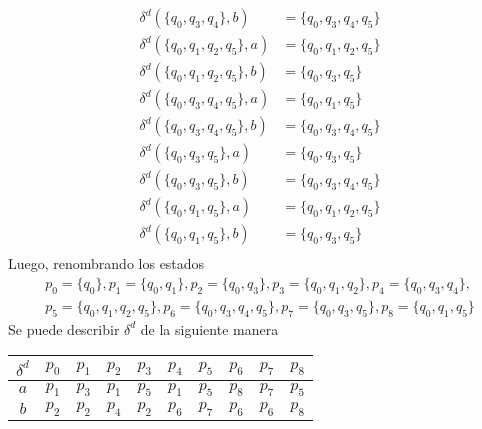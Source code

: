 \documentclass{article}
\begin{document}
\begin{enumerate}
{\begin{itemize}
\begin{enumerate}
{\begin{align*}
                            \delta^{d}(\{q_{0}, q_{3}, q_{4}\}, b) &= \{q_{0}, q_{3}, q_{4}, q_{5}\}\\
                            \delta^{d}(\{q_{0}, q_{1}, q_{2}, q_{5}\}, a) &= \{q_{0}, q_{1}, q_{2}, q_{5}\} \\
                            \delta^{d}(\{q_{0}, q_{1}, q_{2}, q_{5}\}, b) &= \{q_{0}, q_{3}, q_{5}\} \\
                            \delta^{d}(\{q_{0}, q_{3}, q_{4}, q_{5}\}, a) &= \{q_{0}, q_{1}, q_{5}\}  \\
                            \delta^{d}(\{q_{0}, q_{3}, q_{4}, q_{5}\}, b) &= \{q_{0}, q_{3}, q_{4}, q_{5}\} \\
                            \delta^{d}(\{q_{0}, q_{3}, q_{5}\}, a) &= \{q_{0}, q_{3}, q_{5}\}\\
                            \delta^{d}(\{q_{0}, q_{3}, q_{5}\}, b) &= \{q_{0}, q_{3}, q_{4}, q_{5}\} \\
                            \delta^{d}(\{q_{0}, q_{1}, q_{5}\}, a) &= \{q_{0}, q_{1}, q_{2}, q_{5}\}\\
                            \delta^{d}(\{q_{0}, q_{1}, q_{5}\}, b) &= \{q_{0}, q_{3}, q_{5}\} \\
                        \end{align*}
                        Luego, renombrando los estados
                        \begin{align*}
                            p_0 = \{q_{0}\}, p_1 = \{q_{0}, q_{1}\}, 
                            p_2 = \{q_{0}, q_{3}\}, p_3 = \{q_{0}, q_{1}, q_{2}\},
                            p_4 = \{q_{0}, q_{3}, q_{4}\}, \\
                            p_5 = \{q_{0}, q_{1}, q_{2}, q_{5}\},
                            p_6 = \{q_{0}, q_{3}, q_{4}, q_{5}\},
                            p_7 = \{q_{0}, q_{3}, q_{5}\},
                            p_8 = \{q_{0}, q_{1}, q_{5}\}
                        \end{align*}
                        Se puede describir $\delta^{d}$ de la siguiente manera

                        \begin{table}[H]
                            \centering
                            \begin{tabular}{|c|c|c|c|c|c|c|c|c|c|}
                            \hline
                            $\delta^{d}$ & $p_0$ & $p_1$ & $p_2$ & $p_3$ & $p_4$ & $p_5$ & $p_6$ & $p_7$ & $p_8$ \\ \hline
                            $a$          & $p_1$ & $p_3$ & $p_1$ & $p_5$ & $p_1$ & $p_5$ & $p_8$ & $p_7$ & $p_5$ \\ \hline
                            $b$          & $p_2$ & $p_2$ & $p_4$ & $p_2$ & $p_6$ & $p_7$ & $p_6$ & $p_6$ & $p_8$ \\ \hline
                            \end{tabular}
                        \end{table}
                    
}
\end{enumerate}
\end{itemize}}
\end{enumerate}
\end{document}
